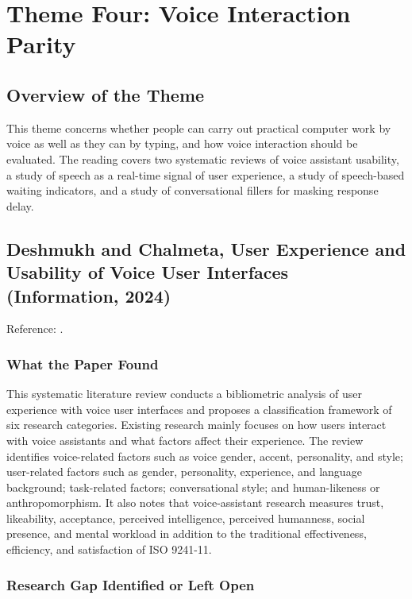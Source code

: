 \documentclass[11pt,a4paper]{report}
\begin{document}
\section{Theme Four: Voice Interaction Parity}

\subsection{Overview of the Theme}

This theme concerns whether people can carry out practical computer work
by voice as well as they can by typing, and how voice interaction
should be evaluated. The reading covers two systematic reviews of voice
assistant usability, a study of speech as a real-time signal of user
experience, a study of speech-based waiting indicators, and a study of
conversational fillers for masking response delay.

\subsection{Deshmukh and Chalmeta, User Experience and Usability of
Voice User Interfaces (Information, 2024)}

\noindent Reference: \autocite{deshmukh2024vui}.

\subsubsection{What the Paper Found}

This systematic literature review conducts a bibliometric analysis of
user experience with voice user interfaces and proposes a
classification framework of six research categories. Existing research
mainly focuses on how users interact with voice assistants and what
factors affect their experience. The review identifies voice-related
factors such as voice gender, accent, personality, and style;
user-related factors such as gender, personality, experience, and
language background; task-related factors; conversational style; and
human-likeness or anthropomorphism. It also notes that voice-assistant
research measures trust, likeability, acceptance, perceived
intelligence, perceived humanness, social presence, and mental workload
in addition to the traditional effectiveness, efficiency, and
satisfaction of ISO 9241-11.

\subsubsection{Research Gap Identified or Left Open}
\end{document}
